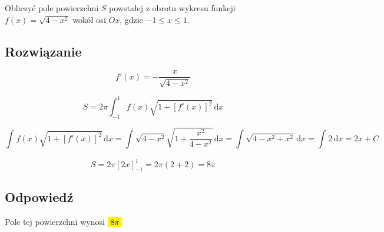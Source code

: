 \documentclass[12pt]{article}
\newcommand{\Integral}[4]{\int_{#1}^{#2} \! #3 \, \mathrm{d}#4}
\newcommand{\mathcolorbox}[2]{\colorbox{#1}{$\displaystyle #2$}}
\DeclareMathOperator{\?}{?}
\begin{document}
Obliczyć pole powierzchni $S$ powstałej z obrotu wykresu funkcji $f(x) = \sqrt{4-x^2}$ wokół osi $Ox$,
gdzie $-1 \le x \le 1$.

\subsection*{Rozwiązanie}

\begin{equation*}
    f'(x) = -\frac{x}{\sqrt{4-x^2}}
\end{equation*}

\begin{equation*}
    S = 2\pi \Integral{-1}{1}{  f(x) \sqrt{1 + \left[f'(x)\right]^2 }  }{x}
\end{equation*}

\begin{equation*}
    \Integral{}{}{ f(x) \sqrt{1 + \left[f'(x)\right]^2 }  }{x} =
    \Integral{}{}{ \sqrt{4-x^2} \sqrt{1 + \frac{x^2}{4-x^2} }  }{x} =
    \Integral{}{}{ \sqrt{4-x^2 + x^2}  }{x} = \Integral{}{}{2}{x} = 2x + C
\end{equation*}

\begin{equation*}
    S = 2\pi \left[ 2x \right]_{-1}^1 = 2\pi (2 + 2) = 8\pi
\end{equation*}

\subsection*{Odpowiedź}

Pole tej powierzchni wynosi $\mathcolorbox{yellow}{8\pi}$
\end{document}

